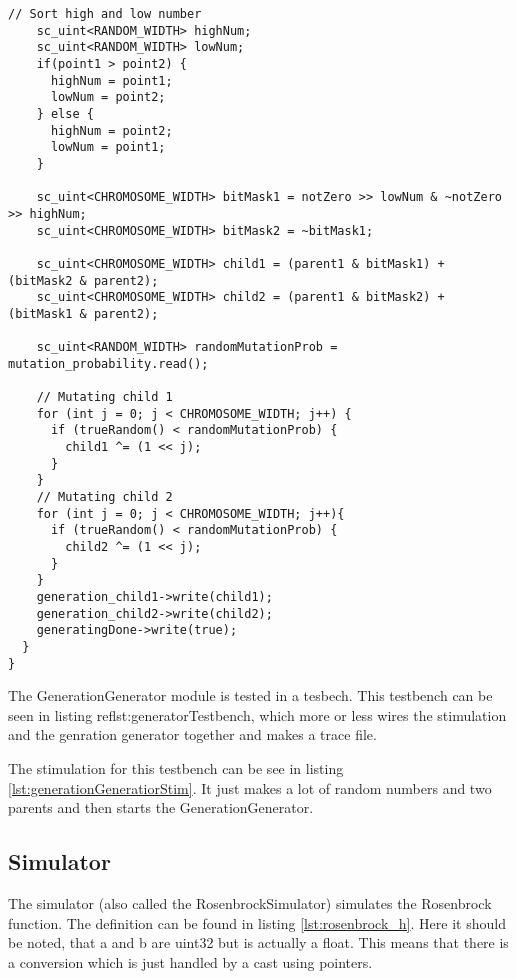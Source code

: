 \begin{lstlisting}[style=customc++,caption={GenerationGenerator.cpp},label={lst:generationgenerator_cpp}]
    // Sort high and low number
    sc_uint<RANDOM_WIDTH> highNum;
    sc_uint<RANDOM_WIDTH> lowNum;
    if(point1 > point2) {
      highNum = point1;
      lowNum = point2;
    } else {
      highNum = point2;
      lowNum = point1;
    }
  
    sc_uint<CHROMOSOME_WIDTH> bitMask1 = notZero >> lowNum & ~notZero >> highNum;
    sc_uint<CHROMOSOME_WIDTH> bitMask2 = ~bitMask1;

    sc_uint<CHROMOSOME_WIDTH> child1 = (parent1 & bitMask1) + (bitMask2 & parent2);
    sc_uint<CHROMOSOME_WIDTH> child2 = (parent1 & bitMask2) + (bitMask1 & parent2);

    sc_uint<RANDOM_WIDTH> randomMutationProb = mutation_probability.read();

    // Mutating child 1
    for (int j = 0; j < CHROMOSOME_WIDTH; j++) {
      if (trueRandom() < randomMutationProb) {
        child1 ^= (1 << j);
      }
    }
    // Mutating child 2
    for (int j = 0; j < CHROMOSOME_WIDTH; j++){
      if (trueRandom() < randomMutationProb) {
        child2 ^= (1 << j);
      }
    }
    generation_child1->write(child1);
    generation_child2->write(child2);
    generatingDone->write(true);
  }
}
\end{lstlisting}

The GenerationGenerator module is tested in a tesbech. This testbench can be seen in listing ref{lst:generatorTestbench}, which more or less wires the stimulation and the genration generator together and makes a trace file.

The stimulation for this testbench can be see in listing \ref{lst:generationGeneratiorStim}. It just makes a lot of random numbers and two parents and then starts the GenerationGenerator.

\subsection{Simulator}
The simulator (also called the RosenbrockSimulator) simulates the Rosenbrock function. The definition can be found in listing \ref{lst:rosenbrock_h}. Here it should be noted, that a and b are uint32 but is actually a float. This means that there is a conversion which is just handled by a cast using pointers.

